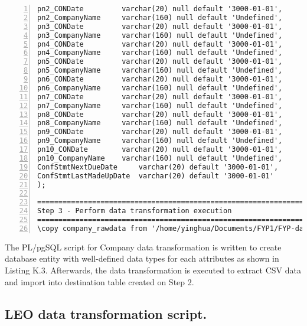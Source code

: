\begin{lstlisting}[breaklines, frame=single, numbers=left, caption={PL/pgSQL's scripts for Company data transformation.}, label=commandline-02]
pn2_CONDate 		varchar(20) null default '3000-01-01',
pn2_CompanyName 	varchar(160) null default 'Undefined',
pn3_CONDate 		varchar(20) null default '3000-01-01',
pn3_CompanyName 	varchar(160) null default 'Undefined',
pn4_CONDate 		varchar(20) null default '3000-01-01',
pn4_CompanyName 	varchar(160) null default 'Undefined',
pn5_CONDate 		varchar(20) null default '3000-01-01',
pn5_CompanyName 	varchar(160) null default 'Undefined',
pn6_CONDate 		varchar(20) null default '3000-01-01',
pn6_CompanyName		varchar(160) null default 'Undefined',
pn7_CONDate 		varchar(20) null default '3000-01-01',
pn7_CompanyName 	varchar(160) null default 'Undefined',
pn8_CONDate 		varchar(20) null default '3000-01-01',
pn8_CompanyName 	varchar(160) null default 'Undefined',
pn9_CONDate 		varchar(20) null default '3000-01-01',
pn9_CompanyName 	varchar(160) null default 'Undefined',
pn10_CONDate 		varchar(20) null default '3000-01-01',
pn10_CompanyName 	varchar(160) null default 'Undefined',
ConfStmtNextDueDate 	varchar(20) default '3000-01-01',
ConfStmtLastMadeUpDate 	varchar(20) default '3000-01-01'
);

==================================================================================
Step 3 - Perform data transformation execution
==================================================================================
\copy company_rawdata from '/home/yinghua/Documents/FYP1/FYP-data/company-data/company-data-full.csv' with header csv;

\end{lstlisting}

The PL/pgSQL script for Company data transformation is written to create database entity with well-defined data types for each attributes as shown in Listing K.3. Afterwards, the data transformation is executed to extract CSV data and import into destination table created on Step 2. 

\subsection{LEO data transformation script.}

